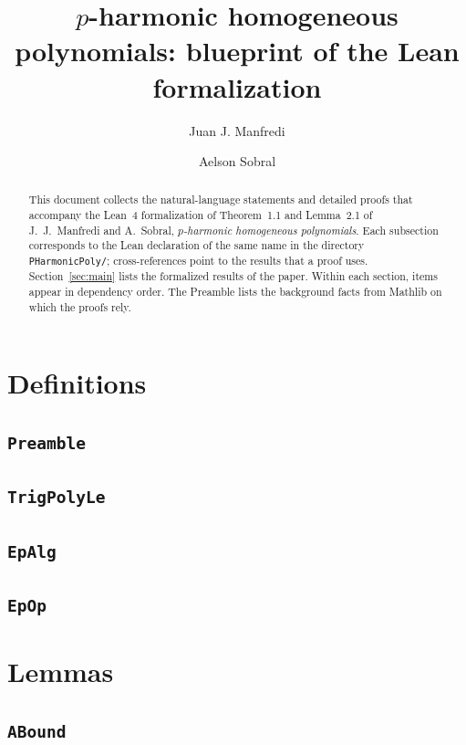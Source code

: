 \documentclass[11pt]{amsart}
\title[Blueprint of the Lean formalization]{$p$-harmonic homogeneous polynomials: blueprint of the Lean formalization}
\author{Juan J. Manfredi \and Aelson Sobral}
\theoremstyle{definition}
\begin{document}
\begin{abstract}
This document collects the natural-language statements and detailed proofs that accompany the Lean~4 formalization of Theorem~1.1 and Lemma~2.1 of J.~J.~Manfredi and A.~Sobral, \emph{$p$-harmonic homogeneous polynomials}.
Each subsection corresponds to the Lean declaration of the same name in the directory \texttt{PHarmonicPoly/}; cross-references point to the results that a proof uses.
Section~\ref{sec:main} lists the formalized results of the paper. Within each section, items appear in dependency order.
The Preamble lists the background facts from Mathlib on which the proofs rely.
\end{abstract}
\maketitle
\tableofcontents

\section{Definitions}
\subsection{\texorpdfstring{\texttt{Preamble}}{Preamble}}\label{node:Preamble}


\subsection{\texorpdfstring{\texttt{TrigPolyLe}}{TrigPolyLe}}\label{node:TrigPolyLe}


\subsection{\texorpdfstring{\texttt{EpAlg}}{EpAlg}}\label{node:EpAlg}


\subsection{\texorpdfstring{\texttt{EpOp}}{EpOp}}\label{node:EpOp}


\section{Lemmas}
\subsection{\texorpdfstring{\texttt{ABound}}{ABound}}\label{node:ABound}

\end{document}
